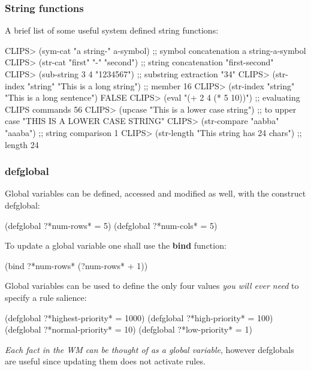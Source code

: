 \documentclass[xcolor={usenames,dvipsnames,svgnames}, compress]{beamer}
\begin{document}
\begin{frame}[fragile]
  \frametitle{String functions}
  A brief list of some useful system defined string functions:
  \begin{clips-code}
    CLIPS> (sym-cat "a string-" a-symbol) ;; symbol concatenation
    a string-a-symbol
    CLIPS> (str-cat "first" "-" "second") ;; string concatenation
    "first-second"
    CLIPS> (sub-string 3 4 "1234567") ;; substring extraction
    "34"
    CLIPS> (str-index "string" "This is a long string") ;; member
    16
    CLIPS> (str-index "string" "This is a long sentence")
    FALSE
    CLIPS> (eval "(+ 2 4 (* 5 10))") ;; evaluating CLIPS commands
    56
    CLIPS> (upcase "This is a lower case string") ;; to upper case
    "THIS IS A LOWER CASE STRING"
    CLIPS> (str-compare "aabba" "aaaba") ;; string comparison
    1
    CLIPS> (str-length "This string has 24 chars") ;; length
    24
  \end{clips-code}
\end{frame}

\begin{frame}[fragile]
  \frametitle{defglobal}
  Global variables can be defined, accessed and modified as well, with
  the construct \textsf{defglobal}:
  \begin{clips-code}[numbers=none]
    (defglobal ?*num-rows* = 5)
    (defglobal ?*num-cols* = 5)
  \end{clips-code}

  To update a global variable one shall use the \textbf{bind}
  function:
  \begin{clips-code}[numbers=none]
    (bind ?*num-rows* (?num-rows* + 1))
  \end{clips-code}

  Global variables can be used to define the only four values \emph{you will
  ever need} to specify a rule salience:
  \begin{clips-code}[numbers=none]
    (defglobal ?*highest-priority* = 1000)
    (defglobal ?*high-priority* = 100)
    (defglobal ?*normal-priority* = 10)
    (defglobal ?*low-priority* = 1)
  \end{clips-code}

  \emph{Each fact in the WM can be thought of as a global variable}, however
  \textsf{defglobal}s are useful since updating them does not activate rules.
\end{frame}
\end{document}
